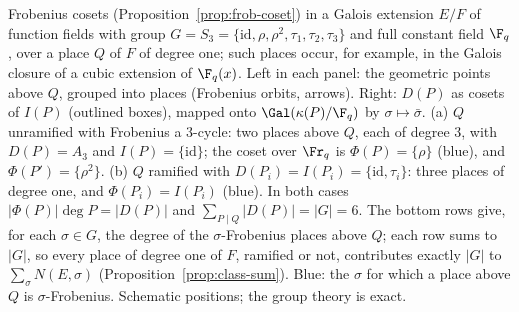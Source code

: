 \caption{Frobenius cosets (Proposition~\ref{prop:frob-coset}) in a Galois
extension $E/F$ of function fields with group $G=S_3=\{\mathrm{id},\rho,
\rho^2,\tau_1,\tau_2,\tau_3\}$ and full constant field $\F_q$, over a place
$Q$ of $F$ of degree one; such places occur, for example, in the Galois
closure of a cubic extension of $\F_q(x)$. Left in each panel: the
geometric points above $Q$, grouped into places (Frobenius orbits, arrows).
Right: $D(P)$ as cosets of $I(P)$ (outlined boxes), mapped onto
$\Gal(\kappa(P)/\F_q)$ by $\sigma\mapsto\bar\sigma$. (a) $Q$ unramified with
Frobenius a $3$-cycle: two places above $Q$, each of degree $3$, with
$D(P)=A_3$ and $I(P)=\{\mathrm{id}\}$; the coset over $\Fr_q$ is
$\Phi(P)=\{\rho\}$ (blue), and $\Phi(P')=\{\rho^2\}$. (b) $Q$ ramified
with $D(P_i)=I(P_i)=\{\mathrm{id},\tau_i\}$: three places of degree one,
and $\Phi(P_i)=I(P_i)$ (blue). In both cases
$\lvert\Phi(P)\rvert\deg P=\lvert D(P)\rvert$ and $\sum_{P\mid
Q}\lvert D(P)\rvert=\lvert G\rvert=6$. The bottom rows give, for each
$\sigma\in G$, the degree of the $\sigma$-Frobenius places above $Q$; each
row sums to $\lvert G\rvert$, so every place of degree one of $F$, ramified
or not, contributes exactly $\lvert G\rvert$ to $\sum_\sigma N(E,\sigma)$
(Proposition~\ref{prop:class-sum}). Blue: the $\sigma$ for which a place
above $Q$ is $\sigma$-Frobenius. Schematic positions; the group theory is
exact.}
\label{fig:frob-coset}
